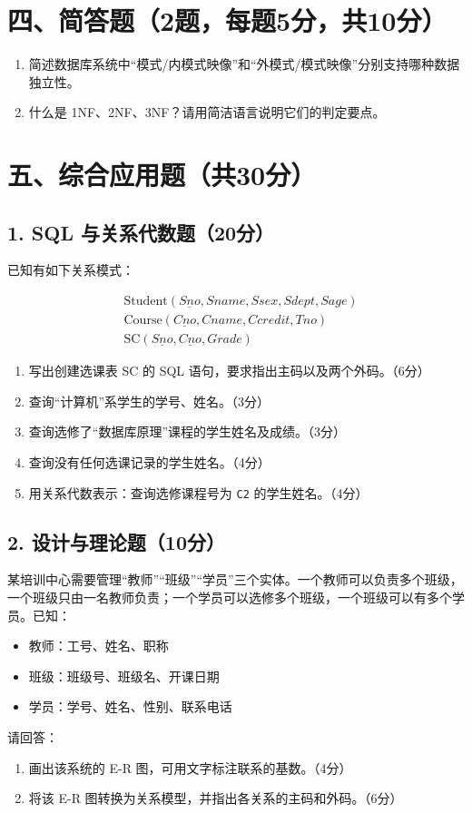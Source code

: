 \documentclass{../../note}
\begin{document}
\section*{四、简答题（2题，每题5分，共10分）}

\begin{enumerate}[itemsep=1em]
\item 简述数据库系统中“模式/内模式映像”和“外模式/模式映像”分别支持哪种数据独立性。
\item 什么是 1NF、2NF、3NF？请用简洁语言说明它们的判定要点。
\end{enumerate}

\section*{五、综合应用题（共30分）}

\subsection*{1. SQL 与关系代数题（20分）}

已知有如下关系模式：

\begin{align*}
&\text{Student}(\underline{Sno}, Sname, Ssex, Sdept, Sage)\\
&\text{Course}(\underline{Cno}, Cname, Ccredit, Tno)\\
&\text{SC}(\underline{Sno}, \underline{Cno}, Grade)
\end{align*}

\begin{enumerate}[label=(\arabic*), itemsep=0.8em]
\item 写出创建选课表 SC 的 SQL 语句，要求指出主码以及两个外码。（6分）
\item 查询“计算机”系学生的学号、姓名。（3分）
\item 查询选修了“数据库原理”课程的学生姓名及成绩。（3分）
\item 查询没有任何选课记录的学生姓名。（4分）
\item 用关系代数表示：查询选修课程号为 \texttt{C2} 的学生姓名。（4分）
\end{enumerate}

\subsection*{2. 设计与理论题（10分）}

某培训中心需要管理“教师”“班级”“学员”三个实体。一个教师可以负责多个班级，一个班级只由一名教师负责；一个学员可以选修多个班级，一个班级可以有多个学员。已知：

\begin{itemize}[itemsep=0.4em]
\item 教师：工号、姓名、职称
\item 班级：班级号、班级名、开课日期
\item 学员：学号、姓名、性别、联系电话
\end{itemize}

请回答：

\begin{enumerate}[label=(\arabic*), itemsep=0.8em]
\item 画出该系统的 E-R 图，可用文字标注联系的基数。（4分）
\item 将该 E-R 图转换为关系模型，并指出各关系的主码和外码。（6分）
\end{enumerate}
\end{document}
